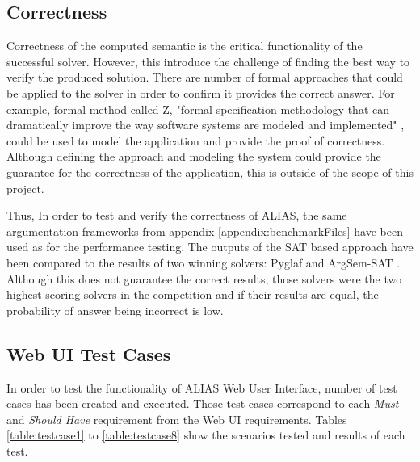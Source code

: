 \subsection{Correctness}
Correctness of the computed semantic is the critical functionality of the successful solver. However, this introduce the challenge of finding the best way to verify the produced solution. There are number of formal approaches that could be applied to the solver in order to confirm it provides the correct answer. For example, formal method called Z, "formal specification methodology that can dramatically improve the way software systems are modeled and implemented" \citep{potter1996introduction}, could be used to model the application and provide the proof of correctness. Although defining the approach and modeling the system could provide the guarantee for the correctness of the application, this is outside of the scope of this project. 

Thus, In order to test and verify the correctness of ALIAS, the same argumentation frameworks from appendix \ref{appendix:benchmarkFiles} have been used as for the performance testing. The outputs of the SAT based approach have been compared to the results of two winning solvers: Pyglaf \citep{pyglaf} and ArgSem-SAT \citep{argsemsat}. Although this does not guarantee the correct results, those solvers were the two highest scoring solvers in the competition and if their results are equal, the probability of answer being incorrect is low.



\subsection{Web UI Test Cases} \label{section:testCases}
In order to test the functionality of ALIAS Web User Interface, number of test cases has been created and executed. Those test cases correspond to each \textit{Must} and \textit{Should Have} requirement from the Web UI requirements. Tables \ref{table:testcase1} to \ref{table:testcase8} show the scenarios tested and results of each test.

